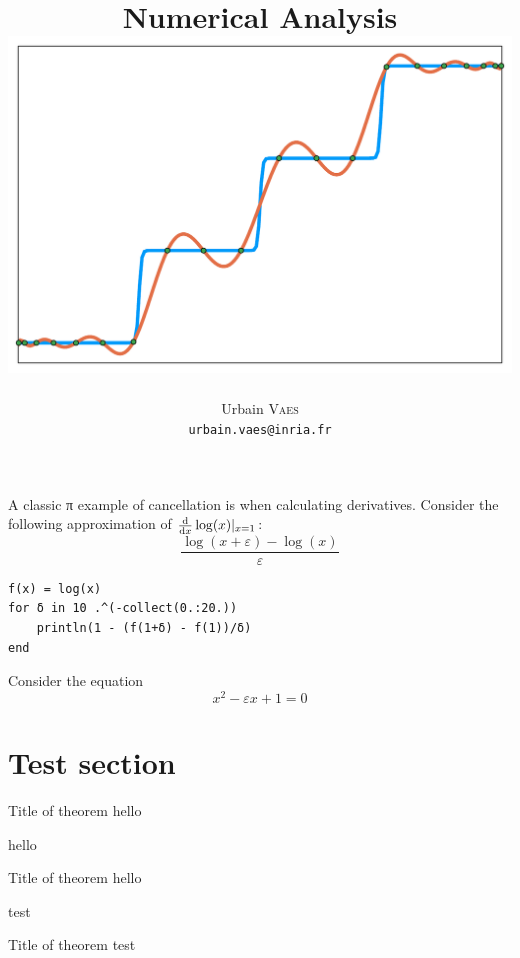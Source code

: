 \documentclass[11pt,a4paper]{report}
\title{\vspace{-1cm}\textbf{Numerical Analysis} \\[1cm]
    \includegraphics[width=.7\textwidth]{figures/chebychev_cover.pdf}
}
\author{%
    Urbain \textsc{Vaes} \\
    \texttt{urbain.vaes@inria.fr}
}
\date{\vspace{1cm} {\large\textsc{NYU Paris}, Spring term 2022} \\[2cm]
    \vfill
    \flushleft \textbf{Weekly schedule}:
    \begin{itemize}
        \item Lectures on Tuesday and Thursday afternoon (2 $\times$ 1h15);
        \item Recitation on Thursday afternoon (1h30);
        \item Office hour on Tuesday, after the lecture.
    \end{itemize}
}
\begin{document}
\maketitle



\tableofcontents


\begin{example}
\end{example}

\begin{example}
    A classic π example of cancellation is when calculating derivatives.
    Consider the following approximation of $\frac{\mathrm d}{\mathrm d x}\log(x) \vert_{x=1}$:
    \[
        	\frac{\log(x + \varepsilon) - \log(x)}{\varepsilon}
    \]
\begin{verbatim}
f(x) = log(x)
for δ in 10 .^(-collect(0.:20.))
    println(1 - (f(1+δ) - f(1))/δ)
end
\end{verbatim}
\end{example}

\begin{example}
    Consider the equation
    \[
        x^2 - \varepsilon x + 1 = 0
    \]
\end{example}

\section{Test section}%
\label{sec:test_section}

\begin{theorem}
    {Title of theorem}
    \label{thm:test}
    hello
\end{theorem}

\begin{example}
    hello
\end{example}

\begin{lemma}
    {Title of theorem}
    \label{lemma:test}
    hello
\end{lemma}

\begin{remark}
    [Hello]
    test
\end{remark}

\begin{theorem}
    {Title of theorem}
    test
\end{theorem}
\end{document}
